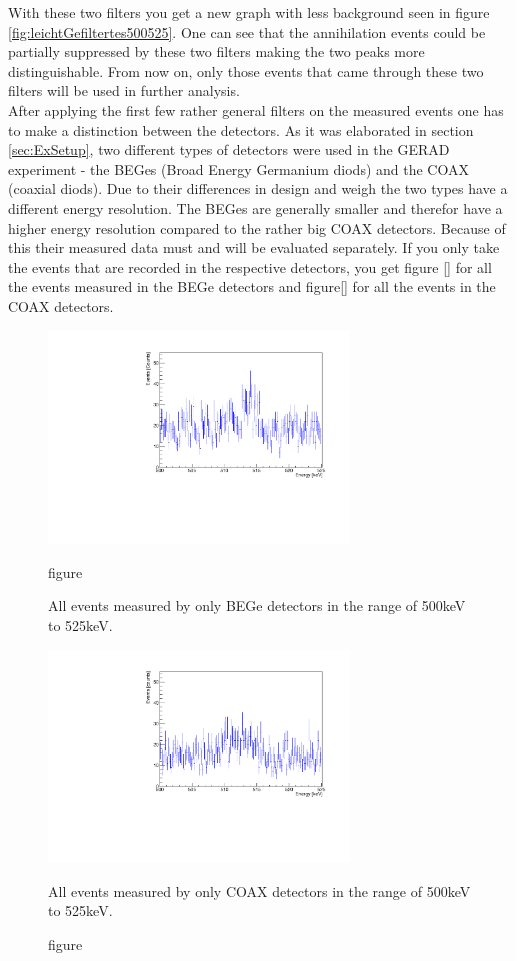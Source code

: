 With these two filters you get a new graph with less background seen in figure \ref{fig:leichtGefiltertes500525}.
One can see that the annihilation events could be partially suppressed by these two filters making the two peaks more distinguishable.
From now on, only those events that came through these two filters will be used in further analysis.
\\

After applying the first few rather general filters on the measured events one has to make a distinction between the detectors.
As it was elaborated in section \ref{sec:ExSetup}, two different types of detectors were used in the GERAD experiment - the BEGes (Broad Energy Germanium diods) and the COAX (coaxial diods). 
Due to their differences in design and weigh the two types have a different energy resolution. 
The BEGes are generally smaller and therefor have a higher energy resolution compared to the rather big COAX detectors.
Because of this their measured data must and will be evaluated separately. 
If you only take the events that are recorded in the respective detectors, you get figure \ref{} for all the events measured in the BEGe detectors and figure\ref{} for all the events in the COAX detectors.
\\

\begin{figure}[ht]
\centering
\begin{minipage}{.5\textwidth}
  \centering
	\includegraphics[width=80mm]{./Bilder/500525NoFilterBEGes.pdf}
  \caption{figure}{All events measured by only BEGe detectors in the range of 500keV to 525keV.}
  \label{fig:test1}
\end{minipage}%
\begin{minipage}{.5\textwidth}
  \centering
	\includegraphics[width=80mm]{./Bilder/500525NoFilterCOAX.pdf}
  \caption{figure}{All events measured by only COAX detectors in the range of 500keV to 525keV.}
  \label{fig:test2}
\end{minipage}
\end{figure}

